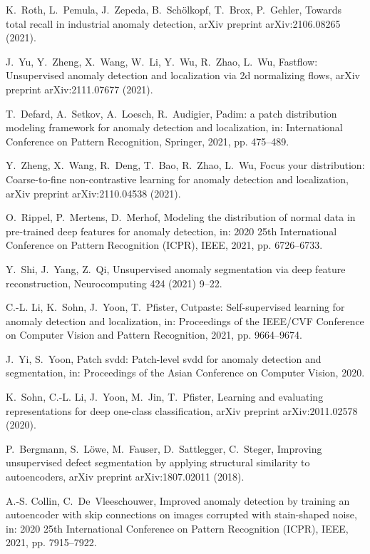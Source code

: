 \documentclass[5p, twocolumn]{elsarticle}[draft]
\begin{document}
\begin{thebibliography}{10}
K.~Roth, L.~Pemula, J.~Zepeda, B.~Sch{\"o}lkopf, T.~Brox, P.~Gehler, Towards
  total recall in industrial anomaly detection, arXiv preprint arXiv:2106.08265
  (2021).

J.~Yu, Y.~Zheng, X.~Wang, W.~Li, Y.~Wu, R.~Zhao, L.~Wu, Fastflow: Unsupervised
  anomaly detection and localization via 2d normalizing flows, arXiv preprint
  arXiv:2111.07677 (2021).

T.~Defard, A.~Setkov, A.~Loesch, R.~Audigier, Padim: a patch distribution
  modeling framework for anomaly detection and localization, in: International
  Conference on Pattern Recognition, Springer, 2021, pp. 475--489.

Y.~Zheng, X.~Wang, R.~Deng, T.~Bao, R.~Zhao, L.~Wu, Focus your distribution:
  Coarse-to-fine non-contrastive learning for anomaly detection and
  localization, arXiv preprint arXiv:2110.04538 (2021).

O.~Rippel, P.~Mertens, D.~Merhof, Modeling the distribution of normal data in
  pre-trained deep features for anomaly detection, in: 2020 25th International
  Conference on Pattern Recognition (ICPR), IEEE, 2021, pp. 6726--6733.

Y.~Shi, J.~Yang, Z.~Qi, Unsupervised anomaly segmentation via deep feature
  reconstruction, Neurocomputing 424 (2021) 9--22.

C.-L. Li, K.~Sohn, J.~Yoon, T.~Pfister, Cutpaste: Self-supervised learning for
  anomaly detection and localization, in: Proceedings of the IEEE/CVF
  Conference on Computer Vision and Pattern Recognition, 2021, pp. 9664--9674.

J.~Yi, S.~Yoon, Patch svdd: Patch-level svdd for anomaly detection and
  segmentation, in: Proceedings of the Asian Conference on Computer Vision,
  2020.

K.~Sohn, C.-L. Li, J.~Yoon, M.~Jin, T.~Pfister, Learning and evaluating
  representations for deep one-class classification, arXiv preprint
  arXiv:2011.02578 (2020).

P.~Bergmann, S.~L{\"o}we, M.~Fauser, D.~Sattlegger, C.~Steger, Improving
  unsupervised defect segmentation by applying structural similarity to
  autoencoders, arXiv preprint arXiv:1807.02011 (2018).

A.-S. Collin, C.~De~Vleeschouwer, Improved anomaly detection by training an
  autoencoder with skip connections on images corrupted with stain-shaped
  noise, in: 2020 25th International Conference on Pattern Recognition (ICPR),
  IEEE, 2021, pp. 7915--7922.


\end{thebibliography}
\end{document}
